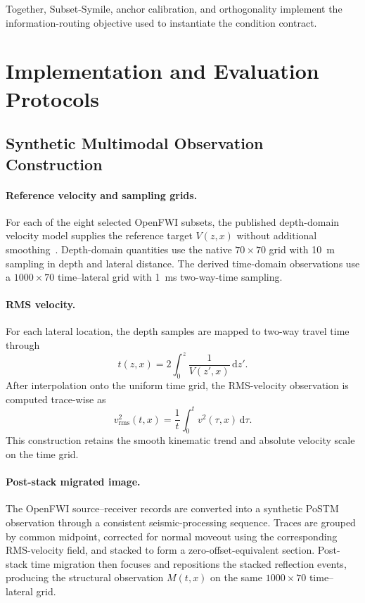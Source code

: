 \documentclass[letterpaper]{article}
\begin{document}
Together, Subset-Symile, anchor calibration, and orthogonality implement the information-routing objective used to instantiate the condition contract.


\section{Implementation and Evaluation Protocols}
\label{app:implementation}
\subsection{Synthetic Multimodal Observation Construction}
\paragraph{Reference velocity and sampling grids.}
For each of the eight selected OpenFWI subsets, the published depth-domain velocity model supplies the reference target $V(z,x)$ without additional smoothing~\cite{deng2022openfwi}. Depth-domain quantities use the native $70\times70$ grid with 10~m sampling in depth and lateral distance. The derived time-domain observations use a $1000\times70$ time--lateral grid with 1~ms two-way-time sampling.

\paragraph{RMS velocity.}
For each lateral location, the depth samples are mapped to two-way travel time through
\begin{equation}
t(z,x)=2\int_0^z\frac{1}{V(z',x)}\,\mathrm{d}z'.
\label{eq:rms-twt-construction}
\end{equation}
After interpolation onto the uniform time grid, the RMS-velocity observation is computed trace-wise as~\cite{dix1955velocities}
\begin{equation}
v_{\mathrm{rms}}^2(t,x)=\frac{1}{t}\int_0^t v^2(\tau,x)\,\mathrm{d}\tau.
\label{eq:rms-observation-construction}
\end{equation}
This construction retains the smooth kinematic trend and absolute velocity scale on the time grid.

\paragraph{Post-stack migrated image.}
The OpenFWI source--receiver records are converted into a synthetic PoSTM observation through a consistent seismic-processing sequence. Traces are grouped by common midpoint, corrected for normal moveout using the corresponding RMS-velocity field, and stacked to form a zero-offset-equivalent section. Post-stack time migration then focuses and repositions the stacked reflection events, producing the structural observation $M(t,x)$ on the same $1000\times70$ time--lateral grid.
\end{document}
